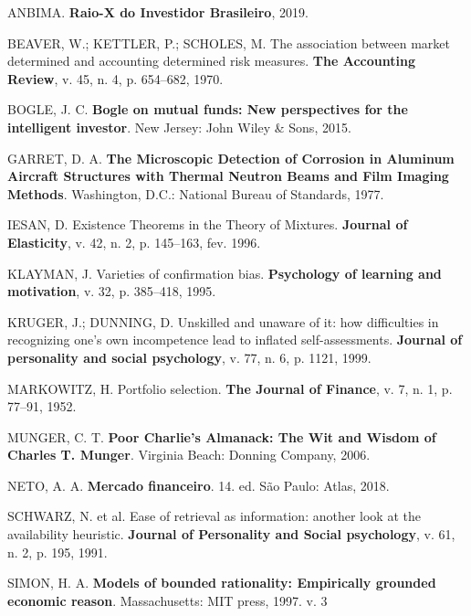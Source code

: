 \documentclass[grad,numbers]{coppe}
\begin{document}
  
  \label{bib:begin}
  \noindent
  
  \setlength{\parindent}{-0.20in}
  \setlength{\leftskip}{0.20in}
  \setlength{\parskip}{8pt}
  
  \hypertarget{refs}{}
  \leavevmode\hypertarget{ref-anbima2019}{}%
  ANBIMA. \textbf{Raio-X do Investidor Brasileiro}, 2019.
  
  \leavevmode\hypertarget{ref-beaver1970}{}%
  BEAVER, W.; KETTLER, P.; SCHOLES, M. The association between market determined and accounting determined risk measures. \textbf{The Accounting Review}, v. 45, n. 4, p. 654--682, 1970.
  
  \leavevmode\hypertarget{ref-bogle2015}{}%
  BOGLE, J. C. \textbf{Bogle on mutual funds: New perspectives for the intelligent investor}. New Jersey: John Wiley \& Sons, 2015.
  
  \leavevmode\hypertarget{ref-techreport-exampleIn}{}%
  GARRET, D. A. \textbf{The Microscopic Detection of Corrosion in Aluminum Aircraft Structures with Thermal Neutron Beams and Film Imaging Methods}. Washington, D.C.: National Bureau of Standards, 1977.
  
  \leavevmode\hypertarget{ref-article-example}{}%
  IESAN, D. Existence Theorems in the Theory of Mixtures. \textbf{Journal of Elasticity}, v. 42, n. 2, p. 145--163, fev. 1996.
  
  \leavevmode\hypertarget{ref-klayman1995}{}%
  KLAYMAN, J. Varieties of confirmation bias. \textbf{Psychology of learning and motivation}, v. 32, p. 385--418, 1995.
  
  \leavevmode\hypertarget{ref-kruger1999}{}%
  KRUGER, J.; DUNNING, D. Unskilled and unaware of it: how difficulties in recognizing one's own incompetence lead to inflated self-assessments. \textbf{Journal of personality and social psychology}, v. 77, n. 6, p. 1121, 1999.
  
  \leavevmode\hypertarget{ref-markowitz1952}{}%
  MARKOWITZ, H. Portfolio selection. \textbf{The Journal of Finance}, v. 7, n. 1, p. 77--91, 1952.
  
  \leavevmode\hypertarget{ref-munger2006}{}%
  MUNGER, C. T. \textbf{Poor Charlie's Almanack: The Wit and Wisdom of Charles T. Munger}. Virginia Beach: Donning Company, 2006.
  
  \leavevmode\hypertarget{ref-assafneto2018}{}%
  NETO, A. A. \textbf{Mercado financeiro}. 14. ed. São Paulo: Atlas, 2018.
  
  \leavevmode\hypertarget{ref-schwarz1991}{}%
  SCHWARZ, N. et al. Ease of retrieval as information: another look at the availability heuristic. \textbf{Journal of Personality and Social psychology}, v. 61, n. 2, p. 195, 1991.
  
  \leavevmode\hypertarget{ref-simon1997}{}%
  SIMON, H. A. \textbf{Models of bounded rationality: Empirically grounded economic reason}. Massachusetts: MIT press, 1997. v. 3

  \backmatter
  
  

\end{document}
